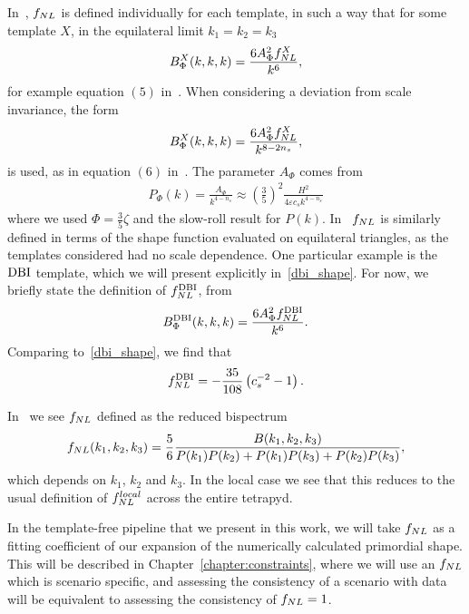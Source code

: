     In~\cite{Planck_NG_2013}, $f_{NL}$ is defined individually for each template, in such a way
    that for some template $X$, in the equilateral limit $k_1=k_2=k_3$
    \begin{align}\label{planck_fnl_defn}
        B^X_\Phi(k,k,k) = \frac{6A_\Phi^2f_{NL}^X}{k^6},
    \end{align}
    for example equation $(5)$ in~\cite{Planck_NG_2013}.
    When considering a deviation from scale invariance, the form
    \begin{align}\label{planck_fnl_defn_ns}
        B^X_\Phi(k,k,k) = \frac{6A_\Phi^2f_{NL}^X}{k^{8-2n_s}},
    \end{align}
    is used,
    as in equation $(6)$ in~\cite{Planck_NG_2013}.
    The parameter $A_\Phi$ comes from
    \begin{align}
        P_\Phi(k) = \frac{A_\Phi}{k^{4-n_s}}\approx\left(\frac{3}{5}\right)^2\frac{H^2}{4\varepsilon c_sk^{4-n_s}}
    \end{align}
    where we used $\Phi=\frac{3}{5}\zeta$ and the slow-roll result for $P(k)$.
    In~\cite{seery_ng_0503, chen_ng_0605, dbi_in_the_sky} $f_{NL}$ is similarly defined in terms
    of the shape function evaluated on equilateral triangles,
    as the templates considered had no scale dependence.
    One particular example is the $\text{DBI}$ template, which we will present explicitly in~\eqref{dbi_shape}.
    For now, we briefly state the definition of $f_{NL}^{\text{DBI}}$, from~\cite{Planck_NG_2013}
    \begin{align}
        B^{\text{DBI}}_\Phi(k,k,k) = \frac{6A_\Phi^2f_{NL}^{\text{DBI}}}{k^{6}}.
    \end{align}
    Comparing to~\eqref{dbi_shape}, we find that
    \begin{align}\label{fnl_dbi_defn}
        f_{NL}^{\text{DBI}} = -\frac{35}{108}\left(c_s^{-2}-1\right).
    \end{align}


    In~\cite{px_burrage, transport_main} we see $f_{NL}$ defined as the reduced bispectrum
    \begin{align}\label{transport_fnl_defn}
        f_{NL}(k_1,k_2,k_3) = \frac{5}{6}\frac{B(k_1,k_2,k_3)}{P(k_1)P(k_2)+P(k_1)P(k_3)+P(k_2)P(k_3)},
    \end{align}
    which depends on $k_1$, $k_2$ and $k_3$. In the local case we see that this reduces to
    the usual definition of $f^{local}_{NL}$ across the entire tetrapyd. %


    In the template-free pipeline that we present in this work,
    we will take $f_{NL}$ as a fitting coefficient of our expansion
    of the numerically calculated primordial shape.
    This will be described in Chapter~\ref{chapter:constraints},
    where we will use an $f_{NL}$ which is scenario specific,
    and assessing the consistency of a scenario with data
    will be equivalent to assessing the consistency of $f_{NL}=1$.



